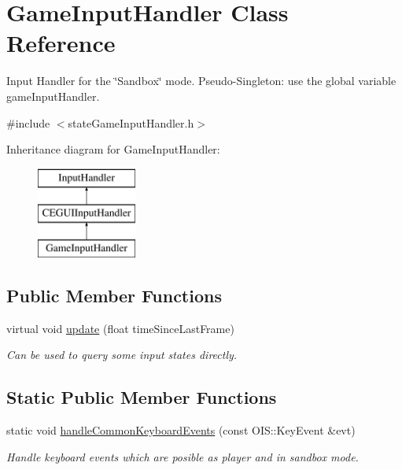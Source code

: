 \hypertarget{classGameInputHandler}{
\section{\-Game\-Input\-Handler \-Class \-Reference}
\label{dc/d26/classGameInputHandler}
}


\-Input \-Handler for the \char`\"{}\-Sandbox\char`\"{} mode. \-Pseudo-\/\-Singleton\-: use the global variable game\-Input\-Handler.  




{\ttfamily \#include $<$state\-Game\-Input\-Handler.\-h$>$}

\-Inheritance diagram for \-Game\-Input\-Handler\-:\begin{figure}[H]
\begin{center}
\leavevmode
\includegraphics[height=3.000000cm]{dc/d26/classGameInputHandler}
\end{center}
\end{figure}
\subsection*{\-Public \-Member \-Functions}
\begin{DoxyCompactItemize}
\item 
\hypertarget{classGameInputHandler_a3ed9909a85797b157850133dc299f169}{
virtual void \hyperlink{classGameInputHandler_a3ed9909a85797b157850133dc299f169}{update} (float time\-Since\-Last\-Frame)}
\label{dc/d26/classGameInputHandler_a3ed9909a85797b157850133dc299f169}

\begin{DoxyCompactList}\small\item\em \-Can be used to query some input states directly. \end{DoxyCompactList}\end{DoxyCompactItemize}
\subsection*{\-Static \-Public \-Member \-Functions}
\begin{DoxyCompactItemize}
\item 
\hypertarget{classGameInputHandler_ae6fab58311a119a9899fa61488af97cf}{
static void \hyperlink{classGameInputHandler_ae6fab58311a119a9899fa61488af97cf}{handle\-Common\-Keyboard\-Events} (const \-O\-I\-S\-::\-Key\-Event \&evt)}
\label{dc/d26/classGameInputHandler_ae6fab58311a119a9899fa61488af97cf}

\begin{DoxyCompactList}\small\item\em \-Handle keyboard events which are posible as player and in sandbox mode. \end{DoxyCompactList}\end{DoxyCompactItemize}
